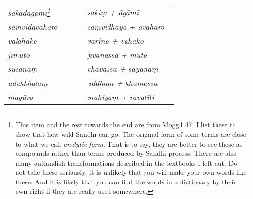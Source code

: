 \begin{longtable}[c]{@{}>{\itshape}p{0.44\linewidth}%
	>{\itshape}p{0.5\linewidth}@{}}
sak\=ad\=ag\=am\=i\footnote{This item and the rest towards the end are from Mogg\,1.47. I list these to show that how wild Sandhi can go. The original form of some terms are close to what we call \emph{analytic form}. That is to say, they are better to see these as compounds rather than terms produced by Sandhi process. There are also many outlandish transformations described in the textbooks I left out. Do not take these seriously. It is unlikely that you will make your own words like these. And it is likely that you can find the words in a dictionary by their own right if they are really used somewhere.} & saki\d m + \=ag\=am\=i \\
sa\d mvid\=avah\=aro & sa\d mvidh\=aya + avah\=aro \\
val\=ahako & v\=arino + v\=ahako \\
j\=imuto & j\=ivanassa + muto \\
sus\=ana\d m & chavassa + sayana\d m \\
udukkhala\d m & uddha\d m + khamassa \\
may\=uro & mahiya\d m + ravat\=iti \\
\end{longtable}



